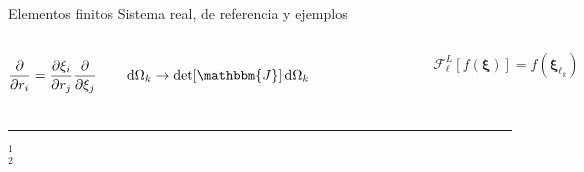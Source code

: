 

\begin{frame}{Elementos finitos}
{Sistema real, de referencia y ejemplos}\small

\begin{columns}
$$
    \pdv{r_i} = \pdv{\xi_i}{r_j} \pdv{\xi_j}
    \qquad
    \dd{\Omega_k} \to \det[\mathbbm{J}]\dd{\Omega_k}
$$
 \begin{figure}\centering    \fontsize{4}{5} \selectfont
        \def\svgwidth{\textwidth}
\end{figure}

$$  \mathcal{F}^{L}_\ell[f(\boldsymbol{\xi})] = f(\boldsymbol{\xi}_{\ell_k}) $$
\begin{figure} \fontsize{4}{5} \selectfont
    \def\svgwidth{\textwidth}
\end{figure}
\end{columns}

\vspace*{1em}
	\noindent\rule{.25\textwidth}{0.4pt}
 \begin{spacing}{0}\fontsize{4}{12} \selectfont
	$^1$ \\
	$^2$ 
	\end{spacing}

\end{frame}


